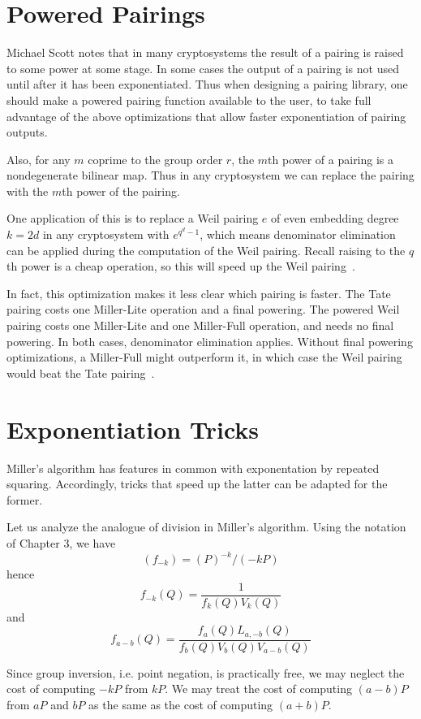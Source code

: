\section {Powered Pairings}

Michael Scott notes that in many cryptosystems the result of a pairing is
raised to some power at some stage. In some cases the output of a pairing
is not used until after it has been exponentiated.
Thus when designing a pairing library, one should make
a powered pairing function available to the user, to take full advantage
of the above optimizations that allow faster exponentiation of pairing outputs.

Also, for any $m$ coprime to the group order $r$, the $m$th power of a pairing
is a nondegenerate bilinear map. Thus in any cryptosystem we can replace
the pairing with the $m$th power of the pairing.

One application of this is to replace a Weil pairing $e$ of even embedding
degree $k = 2d$ in any cryptosystem with $e^{q^d-1}$, which means
denominator elimination can be applied
during the computation of the Weil pairing. Recall raising to the $q$th
power is a cheap operation, so this will speed up the Weil pairing~\cite{km}.

In fact, this optimization makes it less clear which pairing
is faster. The Tate pairing costs one Miller-Lite operation and a final
powering. The powered Weil pairing costs one Miller-Lite
and one Miller-Full operation, and needs no final powering.
In both cases, denominator elimination applies. Without
final powering optimizations, a Miller-Full might outperform it,
in which case the Weil pairing would beat the Tate pairing~\cite{gps}.

\section {Exponentiation Tricks}

Miller's algorithm has features in common with exponentation by repeated
squaring. Accordingly, tricks that speed up the latter can be adapted for the
former.

Let us analyze the analogue of division in Miller's algorithm.
Using the notation of Chapter 3, we have
\[
(f_{-k}) = (P)^{-k}/(-kP)
\]
hence
\[
f_{-k}(Q) = \frac{1}{f_k(Q)V_k(Q)}
\]
and
\[
f_{a-b}(Q) = \frac{f_a(Q)L_{a,-b}(Q)}{f_b(Q)V_b(Q)V_{a-b}(Q)}
\]

Since group inversion, i.e. point negation, is practically free,
we may neglect the cost of computing $-kP$ from $kP$. We may treat
the cost of computing $(a-b)P$ from $aP$ and $bP$ as the same as the
cost of computing $(a+b)P$.

